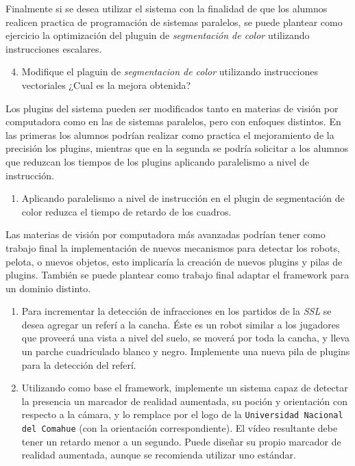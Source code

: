 Finalmente si se desea utilizar el sistema con la finalidad de que los alumnos
realicen practica de programación de sistemas paralelos, se puede plantear como
ejercicio la optimización del pluguin de \emph{segmentación de color} utilizando
instrucciones escalares.

\begin{enumerate}

	\setcounter{enumi}{3}

	\item{Modifique el plaguin de \emph{segmentacion de color} utilizando
	instrucciones vectoriales ¿Cual es la mejora obtenida?}

\end{enumerate}


Los plugins del sistema pueden ser modificados tanto en materias de visión por
computadora como en las de sistemas paralelos, pero con enfoques distintos. En
las primeras los alumnos podrían realizar como practica el mejoramiento de la
precisión los plugins, mientras que en la segunda se podría solicitar a los
alumnos que reduzcan los tiempos de los plugins aplicando paralelismo a nivel de
instrucción.

\begin{enumerate}

	\item{Aplicando paralelismo a nivel de instrucción en el plugin de
		segmentación de color reduzca el tiempo de retardo de los
		cuadros.}

\end{enumerate}

Las materias de visión por computadora más avanzadas podrían tener como trabajo
final la implementación de nuevos mecanismos para detectar los robots, pelota, o
nuevos objetos, esto implicaría la creación de nuevos plugins y pilas de
plugins. También se puede plantear como trabajo final adaptar el framework para
un dominio distinto.

\begin{enumerate}

	\item{Para incrementar la detección de infracciones en los partidos de
		la \emph{SSL} se desea agregar un referí a la cancha. Éste es un
		robot similar a los jugadores que proveerá una vista a nivel del
		suelo, se moverá por toda la cancha, y lleva un parche
		cuadriculado blanco y negro. Implemente una nueva pila de
		plugins para la detección del referí.}

	\item{Utilizando como base el framework, implemente un sistema capaz de
		detectar la presencia un marcador de realidad aumentada, su
		poción y orientación con respecto a la cámara, y lo remplace por
		el logo de la \texttt{Universidad Nacional del Comahue} (con la
		orientación correspondiente). El vídeo resultante debe tener un
		retardo menor a un segundo. Puede diseñar su propio marcador de
		realidad aumentada, aunque se recomienda utilizar uno estándar.}

\end{enumerate}
